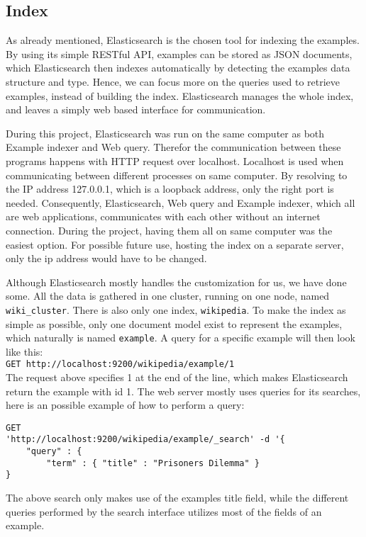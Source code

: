\subsection{Index}
As already mentioned, Elasticsearch is the chosen tool for indexing the examples. By using its simple RESTful API, examples can be stored as JSON documents, which Elasticsearch then indexes automatically by detecting the examples data structure and type. Hence, we can focus more on the queries used to retrieve examples, instead of building the index. Elasticsearch manages the whole index, and leaves a simply web based interface for communication.

During this project, Elasticsearch was run on the same computer as both Example indexer and Web query. Therefor the communication between these programs happens with HTTP request over localhost. Localhost is used when communicating between different processes on same computer. By resolving to the IP address 127.0.0.1, which is a loopback address, only the right port is needed. Consequently, Elasticsearch, Web query and Example indexer, which all are web applications, communicates with each other without an internet connection. During the project, having them all on same computer was the easiest option. For possible future use, hosting the index on a separate server, only the ip address would have to be changed.

Although Elasticsearch mostly handles the customization for us, we have done some. All the data is gathered in one cluster, running on one node, named \texttt{wiki\_cluster}. There is also only one index, \texttt{wikipedia}. To make the index as simple as possible, only one document model exist to represent the examples, which naturally is named \texttt{example}. A query for a specific example will then look like this:\\
\texttt{GET http://localhost:9200/wikipedia/example/1}\\
The request above specifies 1 at the end of the line, which makes Elasticsearch return the example with id 1.
The web server mostly uses queries for its searches, here is an possible example of how to perform a query:
\begin{Verbatim}[fontsize=\small]
GET 
'http://localhost:9200/wikipedia/example/_search' -d '{
    "query" : {
        "term" : { "title" : "Prisoners Dilemma" }
}
\end{Verbatim}
The above search only makes use of the examples title field, while the different queries performed by the search interface utilizes most of the fields of an example.


